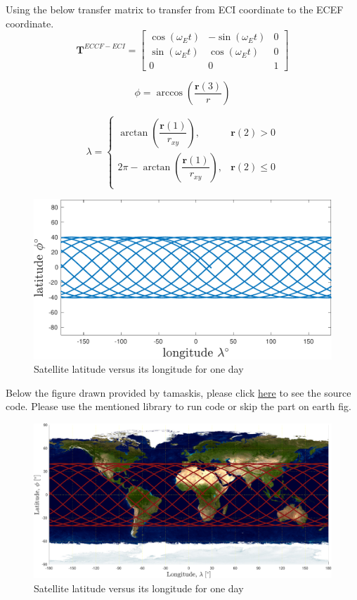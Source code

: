 Using the below transfer matrix to transfer from ECI coordinate to the ECEF coordinate.
$$
\boldsymbol T^{ECCF-ECI} = \begin{bmatrix}
    \cos(\omega_Et) & -\sin(\omega_Et)& 0\\
    \sin(\omega_Et) &  \cos(\omega_Et)& 0\\
            0       &      0          & 1
\end{bmatrix}
$$

$$
\phi = \arccos(\dfrac{\boldsymbol r(3)}{r})
$$

$$
\lambda = 
\begin{cases}
\arctan(\dfrac{\boldsymbol r(1)}{r_{xy}}),& \boldsymbol r(2) > 0\\
2\pi-\arctan(\dfrac{\boldsymbol r(1)}{r_{xy}}),& \boldsymbol r(2) \leq 0\\
\end{cases}
$$

\begin{figure}[H]
    \caption{Satellite latitude versus its longitude for one day}
    \centering
    \includegraphics[width=16cm]{../Figure/Q2/latlong}
\end{figure}

Below the figure drawn provided by tamaskis, please click \href{https://github.com/tamaskis/ground_track-MATLAB}{here} to see the source code. Please use the mentioned library to run code or skip the part on earth fig.

\begin{figure}[H]
    \caption{Satellite latitude versus its longitude for one day}
    \centering
    \includegraphics[width=16cm]{../Figure/Q2/latlong_earth}
\end{figure}

